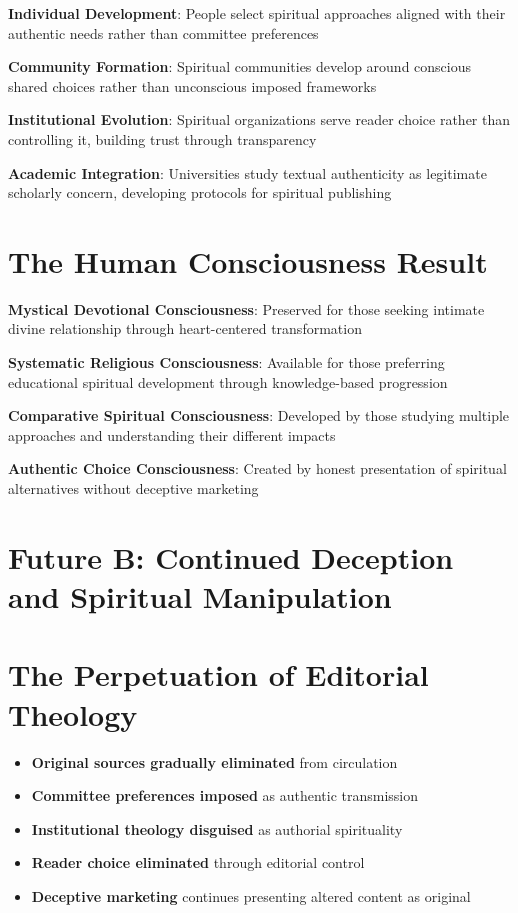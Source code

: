 \documentclass[11pt,twoside]{book}
\begin{document}
\textbf{\textbf{Individual Development}}: People select spiritual approaches aligned with their authentic needs rather than committee preferences

\textbf{\textbf{Community Formation}}: Spiritual communities develop around conscious shared choices rather than unconscious imposed frameworks

\textbf{\textbf{Institutional Evolution}}: Spiritual organizations serve reader choice rather than controlling it, building trust through transparency

\textbf{\textbf{Academic Integration}}: Universities study textual authenticity as legitimate scholarly concern, developing protocols for spiritual publishing
\section*{The Human Consciousness Result}
\label{sec:orgdc0b1bc}
\textbf{\textbf{Mystical Devotional Consciousness}}: Preserved for those seeking intimate divine relationship through heart-centered transformation

\textbf{\textbf{Systematic Religious Consciousness}}: Available for those preferring educational spiritual development through knowledge-based progression

\textbf{\textbf{Comparative Spiritual Consciousness}}: Developed by those studying multiple approaches and understanding their different impacts

\textbf{\textbf{Authentic Choice Consciousness}}: Created by honest presentation of spiritual alternatives without deceptive marketing
\section*{Future B: Continued Deception and Spiritual Manipulation}
\label{sec:orgb9e6b66}

\section*{The Perpetuation of Editorial Theology}
\label{sec:orgde3747c}
\begin{itemize}
\item \textbf{\textbf{Original sources gradually eliminated}} from circulation
\item \textbf{\textbf{Committee preferences imposed}} as authentic transmission
\item \textbf{\textbf{Institutional theology disguised}} as authorial spirituality
\item \textbf{\textbf{Reader choice eliminated}} through editorial control
\item \textbf{\textbf{Deceptive marketing}} continues presenting altered content as original
\end{itemize}
\end{document}
